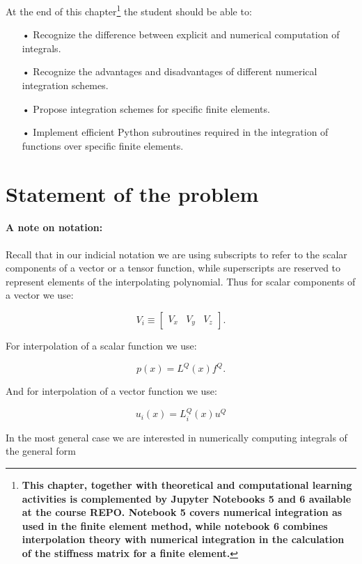 At the end of this chapter\footnote{{\bf This chapter, together with theoretical and computational learning activities is complemented by Jupyter Notebooks 5 and 6 available at the course REPO. Notebook 5 covers numerical integration as used in the finite element method, while notebook 6 combines interpolation theory with numerical integration in the calculation of the stiffness matrix for a finite element.}} the student should be able to:


\begin{itemize}
\item[•] Recognize the difference between explicit and numerical computation of integrals.
\item[•] Recognize the advantages and disadvantages of different numerical integration schemes.
\item[•] Propose integration schemes for specific finite elements.
\item[•] Implement efficient Python subroutines required in the integration of functions over specific finite elements.
\end{itemize}  



\section{Statement of the problem}

\begin{tcolorbox}
\paragraph*{A note on notation:}
Recall that in our indicial notation we are using subscripts to refer to the scalar components of a vector or a tensor function, while superscripts are reserved to represent elements of the interpolating polynomial. Thus for scalar components of a vector we use:

\[V_i\equiv\begin{bmatrix}V_x&V_y&V_z\end{bmatrix}.\]

For interpolation of a scalar function we use:

\[p(x)=L^Q(x)f^Q.\]

And for interpolation of a vector function we use:

\[u_i(x)=L_i^Q(x)u^Q\]

\end{tcolorbox}

In the most general case we are interested in numerically computing integrals of the general form


